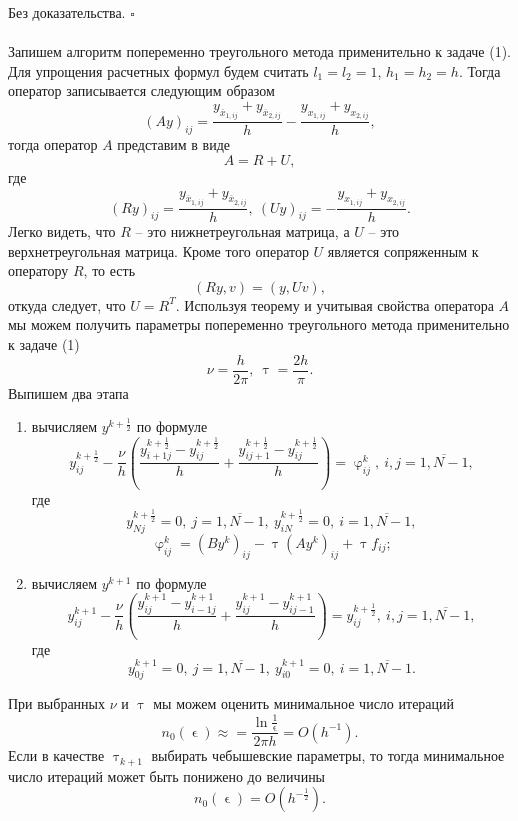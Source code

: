 \documentclass[a4paper, 12pt]{report}
\numberwithin{equation}{section}
\newenvironment{Proof} %
{\par\noindent{$\blacklozenge$}} %
{\hfill$\scriptstyle\square$}
\newcommand{\ol}{\overline}
\renewcommand{\varphi}{\upvarphi}
\renewcommand{\tau}{\uptau}
\renewcommand{\epsilon}{\upvarepsilon}
\begin{document}
	\begin{Proof}
		Без доказательства.
	\end{Proof}\\\\
	Запишем алгоритм попеременно треугольного метода применительно к задаче (1). Для упрощения расчетных формул будем считать $l_1 = l_2 =1$, $h_1 = h_2 = h$. Тогда оператор записывается следующим образом
	$$(Ay)_{ij} = \dfrac{y_{\ol{ x}_{1, ij}} + y_{\ol {x}_{2,ij}}}{h} - \dfrac{y_{{ x_{1, ij}}} + y_{ {x_{2,ij}}}}{h},$$
	тогда оператор $A$ представим в виде
	$$A = R+U,$$
	где $$(Ry)_{ij} = \dfrac{y_{\ol{ x}_{1, ij}} + y_{\ol {x}_{2,ij}}}{h},\ (Uy)_{ij} = - \dfrac{y_{{ x_{1, ij}}} + y_{ {x_{2,ij}}}}{h}.$$
	Легко видеть, что $R$ -- это нижнетреугольная матрица, а $U$ -- это верхнетреугольная матрица. Кроме того оператор $U$ является сопряженным к оператору $R$, то есть
	$$(Ry , v) = (y, Uv),$$
	откуда следует, что $U = R^T$.
	Используя теорему и учитывая свойства оператора $A$ мы можем получить параметры попеременно треугольного метода применительно к задаче (1)
	\begin{equation}
		\nu = \dfrac{h}{2\pi} ,\ \tau = \dfrac{2h}{\pi}.
	\end{equation}
	Выпишем два этапа
	\begin{enumerate}
		\item вычисляем $y^{k+\frac 12}$ по формуле
		\begin{equation}
			y_{ij}^{k+\frac 12} - \dfrac \nu h \left(\dfrac{y_{i+1j}^{k+\frac 12} - y_{ij}^{k+\frac 12}}{h} + \dfrac{y_{ij+1}^{k+\frac 12} - y_{ij}^{k+\frac 12}}{h}\right) = \varphi_{ij}^k,\ i,j = \overline{1, N-1},
		\end{equation}
		где $$y_{Nj}^{k + \frac 12} = 0,\ j=\ol{1, N-1},\ y_{iN}^{k+\frac12} = 0,\ i = \ol{1,N-1},$$
		$$\varphi_{ij}^k = (By^k)_{ij} - \tau (Ay^k)_{ij} + \tau f_{ij};$$
		\item вычисляем $y^{k+1}$ по формуле
		\begin{equation}
			y_{ij}^{k+1} - \dfrac \nu h \left(\dfrac{y_{ij}^{k+1} - y_{i-1j}^{k+1}}{h} + \dfrac{y_{ij}^{k+1} - y_{ij-1}^{k+1}}{h}\right) = y_{ij}^{k+\frac 12},\ i,j = \overline{1, N-1},
		\end{equation}
		где $$y_{0j}^{k + 1} = 0,\ j=\ol{1, N-1},\ y_{i0}^{k+1} = 0,\ i = \ol{1,N-1}.$$
	\end{enumerate}
	При выбранных $\nu$ и $\tau$ мы можем оценить минимальное число итераций
	$$n_0(\epsilon)\approx = \dfrac{\ln \frac 1 \epsilon}{2 \pi h} = O(h^{-1}).$$
	Если в качестве $\tau_{k+1}$ выбирать чебышевские параметры, то тогда минимальное число итераций может быть понижено до величины
	$$n_0 (\epsilon) = O(h^{-\frac 12}).$$
\end{document}
